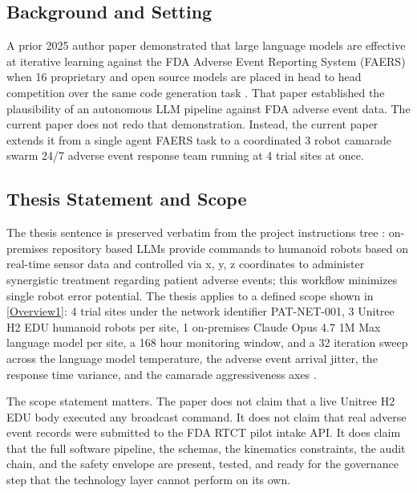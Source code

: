 \begin{sectionaccent}
\subsection{Background and Setting}
\label{sec:intro-background}

A prior 2025 author paper demonstrated that large language models are
effective at iterative learning against the FDA Adverse Event
Reporting System (FAERS) when 16 proprietary and open source models
are placed in head to head competition over the same code generation
task \cite{kawchak_2025_18029100}. That paper established the
plausibility of an autonomous LLM pipeline against FDA adverse event
data. The current paper does not redo that demonstration. Instead, the current
paper extends it from a single agent FAERS task to a coordinated
3 robot camarade swarm 24/7 adverse event response team running at
4 trial sites at once.

\subsection{Thesis Statement and Scope}
\label{sec:intro-thesis}

The thesis sentence is preserved verbatim from the project
instructions tree \cite{kawchak_2026_humanoid_instructions}:
on-premises repository based LLMs provide commands to humanoid robots
based on real-time sensor data and controlled via x, y, z coordinates
to administer synergistic treatment regarding patient adverse events;
this workflow minimizes single robot error potential. The thesis
applies to a defined scope shown in \autoref{Overview1}: 4 trial sites under the network
identifier PAT-NET-001, 3 Unitree H2 EDU humanoid robots per site, 1
on-premises Claude Opus 4.7 1M Max language model per site, a 168 hour
monitoring window, and a 32 iteration sweep across the
language model temperature, the adverse event arrival jitter, the
response time variance, and the camarade aggressiveness axes
\cite{unitree_h2_2026, nvidia_jetson_thor_2026,
anthropic_claude_opus_47_2026}.

The scope statement matters. The paper does not claim that a live
Unitree H2 EDU body executed any broadcast command. It does not claim
that real adverse event records were submitted to the FDA RTCT pilot
intake API. It does claim that the full software pipeline, the
schemas, the kinematics constraints, the audit chain, and the safety
envelope are present, tested, and ready for the governance step that
the technology layer cannot perform on its own.


\end{sectionaccent}
